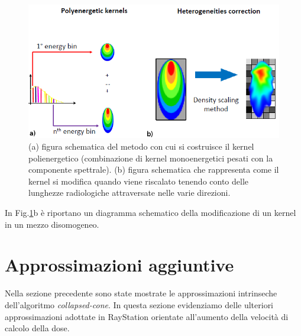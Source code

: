 {\begin{figure}
\centering
\includegraphics[width=\textwidth]{./cap1/kern_trans.png}
\caption{(a) figura schematica del metodo con cui si costruisce il kernel polienergetico (combinazione di kernel monoenergetici pesati con la componente spettrale). (b) figura schematica che rappresenta come il kernel si modifica quando viene riscalato tenendo conto delle lunghezze radiologiche attraversate nelle varie direzioni.}
\label{fig:kern_trans}
\end{figure}

In Fig.\ref{fig:kern_trans}b è riportano un diagramma schematico della modificazione di un kernel in un mezzo disomogeneo.



\section{Approssimazioni aggiuntive}
Nella sezione precedente sono state mostrate le approssimazioni intrinseche dell'algoritmo \textit{collapsed-cone}. In questa sezione evidenziamo delle ulteriori approssimazioni adottate in RayStation orientate all'aumento della velocità di calcolo della dose.

}
